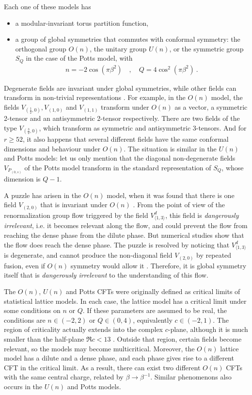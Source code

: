 \documentclass[12pt, a4paper]{article}
\theoremstyle{break}
\begin{document}
Each one of these models has
\begin{itemize}
 \item a modular-invariant torus partition function,
 \item a group of global symmetries that commutes with conformal symmetry: the orthogonal group $O(n)$, the unitary group $U(n)$, or the symmetric group $S_Q$ in the case of the Potts model, with 
 \begin{align}
  n = -2\cos\left(\pi \beta^2\right) \quad , \quad Q = 4\cos^2\left(\pi \beta^2\right)\ .
 \end{align}
\end{itemize}
Degenerate fields are invariant under global symmetries, while other fields can transform in non-trivial representations \cite{jrs22}. For example, in the $O(n)$ model, the fields $V_{(\frac12,0)},V_{(1,0)}$ and $V_{(1,1)}$ transform under $O(n)$ as a vector, a symmetric 2-tensor and an antisymmetric 2-tensor respectively. There are two fields of the type $V_{(\frac32,0)}$, which transform as symmetric and antisymmetric 3-tensors. And for $r\geq 52$, it also happens that several different fields have the same conformal dimensions and behaviour under $O(n)$. The situation is similar in the $U(n)$ and Potts models: let us only mention that the diagonal non-degenerate fields $V_{P_{(0,s)}}$ of the Potts model transform in the standard  representation of $S_Q$, whose dimension is $Q-1$. 

A puzzle has arisen in the $O(n)$ model, when it was found that there is one field $V_{(2,0)}$ that is invariant under $O(n)$ \cite{gz20}. From the point of view of the renormalization group flow triggered by the field $V^d_{\langle 1,3\rangle}$, this field is \textit{dangerously irrelevant}, i.e. it becomes relevant along the flow, and could prevent the flow from reaching the dense phase from the dilute phase. But numerical studies show that the flow does reach the dense phase. The puzzle is resolved by noticing that $V^d_{\langle 1,3\rangle}$ is degenerate, and cannot produce the non-diagonal field $V_{(2,0)}$ by repeated fusion, even if $O(n)$ symmetry would allow it \cite{js23}. Therefore, it is global symmetry itself that is \textit{dangerously irrelevant} to the understanding of this flow. 

The $O(n)$, $U(n)$ and Potts CFTs were originally defined as critical limits of statistical lattice models. In each case, the lattice model has a critical limit under some conditions on $n$ or $Q$. If these parameters are assumed to be real, the conditions are $n\in (-2,2)$ or $Q\in (0,4)$, equivalently $c\in (-2,1)$. The region of criticality actually extends into the complex $c$-plane, although it is much smaller than the half-plane $\Re c<13$ \cite{bjjz22}. Outside that region, certain fields become relevant, so the models may become multicritical. Moreover, the $O(n)$ lattice model has a dilute and a dense phase, and each phase gives rise to a different CFT in the critical limit. As a result, there can exist two different $O(n)$ CFTs with the same central charge, related by $\beta \to\beta^{-1}$. Similar phenomenons also occurs in the $U(n)$ and Potts models.
\end{document}
